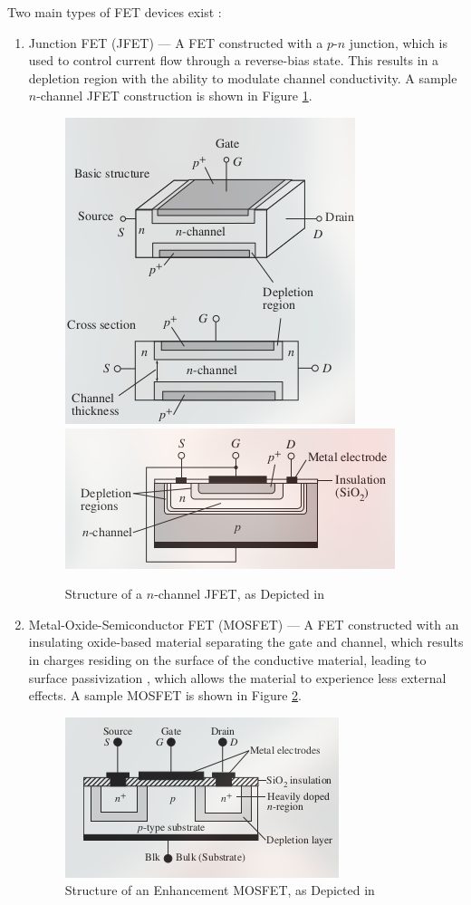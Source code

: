 \documentclass[conference]{IEEEtran}
\begin{document}
Two main types of FET devices exist \cite[Pages 615 \& 624]{textbook}:

\begin{enumerate}

  \item Junction FET (JFET) — A FET constructed with a $p$-$n$ junction, which is used to control current flow through a reverse-bias state. This results in a depletion region with the ability to modulate channel conductivity. A sample $n$-channel JFET construction is shown in Figure \ref{fig:1}.

    \begin{figure}[h]
      \centering
      \includegraphics[width=.3\textwidth]{Figures/JFET1}
      \includegraphics[width=.3\textwidth]{Figures/JFET2}
      \caption{Structure of a $n$-channel JFET, as Depicted in \cite[Page 615]{textbook}}
      \label{fig:1}
    \end{figure}

  \item Metal-Oxide-Semiconductor FET (MOSFET) — A FET constructed with an insulating oxide-based material separating the gate and channel, which results in charges residing on the surface of the conductive material, leading to surface passivization \cite{wiki}, which allows the material to experience less external effects. A sample MOSFET is shown in Figure \ref{fig:2}.

    \begin{figure}[h]
      \centering
      \includegraphics[width=.35\textwidth]{Figures/MOSFET}
      \caption{Structure of an Enhancement MOSFET, as Depicted in \cite[Page 627]{textbook}}
      \label{fig:2}
    \end{figure}

\end{enumerate}
\end{document}
